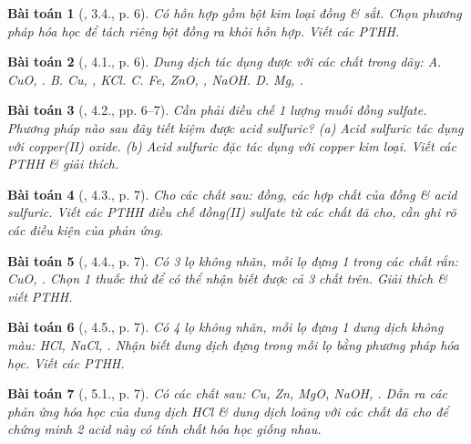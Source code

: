 \documentclass{article}
\newtheorem{baitoan}{Bài toán}
\begin{document}
\begin{baitoan}[\cite{SBT_Hoa_Hoc_9}, 3.4., p. 6]
	Có hỗn hợp gồm bột kim loại đồng \& sắt. Chọn phương pháp hóa học để tách riêng bột đồng ra khỏi hỗn hợp. Viết các PTHH.
\end{baitoan}

\begin{baitoan}[\cite{SBT_Hoa_Hoc_9}, 4.1., p. 6]
	Dung dịch \emph{} tác dụng được với các chất trong dãy: {\sf A.} \emph{CuO, }. {\sf B.} \emph{Cu, , KCl}. {\sf C.} \emph{Fe, ZnO, , NaOH}. {\sf D.} \emph{Mg, }.
\end{baitoan}

\begin{baitoan}[\cite{SBT_Hoa_Hoc_9}, 4.2., pp. 6--7]
	Cần phải điều chế 1 lượng muối đồng sulfate. Phương pháp nào sau đây tiết kiệm được acid sulfuric? (a) Acid sulfuric tác dụng với copper(II) oxide. (b) Acid sulfuric đặc tác dụng với copper kim loại. Viết các PTHH \& giải thích.
\end{baitoan}

\begin{baitoan}[\cite{SBT_Hoa_Hoc_9}, 4.3., p. 7]
	Cho các chất sau: đồng, các hợp chất của đồng \& acid sulfuric. Viết các PTHH điều chế đồng(II) sulfate từ các chất đã cho, cần ghi rõ các điều kiện của phản ứng.
\end{baitoan}

\begin{baitoan}[\cite{SBT_Hoa_Hoc_9}, 4.4., p. 7]
	Có 3 lọ không nhãn, mỗi lọ đựng 1 trong các chất rắn: \emph{CuO, }. Chọn 1 thuốc thử để có thể nhận biết được cả 3 chất trên. Giải thích \& viết PTHH.
\end{baitoan}

\begin{baitoan}[\cite{SBT_Hoa_Hoc_9}, 4.5., p. 7]
	Có 4 lọ không nhãn, mỗi lọ đựng 1 dung dịch không màu: \emph{HCl, NaCl, }. Nhận biết dung dịch đựng trong mỗi lọ bằng phương pháp hóa học. Viết các PTHH.
\end{baitoan}

\begin{baitoan}[\cite{SBT_Hoa_Hoc_9}, 5.1., p. 7]
	Có các chất sau: \emph{Cu, Zn, MgO, NaOH, }. Dẫn ra các phản ứng hóa học của dung dịch \emph{HCl} \& dung dịch \emph{} loãng với các chất đã cho để chứng minh 2 acid này có tính chất hóa học giống nhau.
\end{baitoan}
\end{document}
